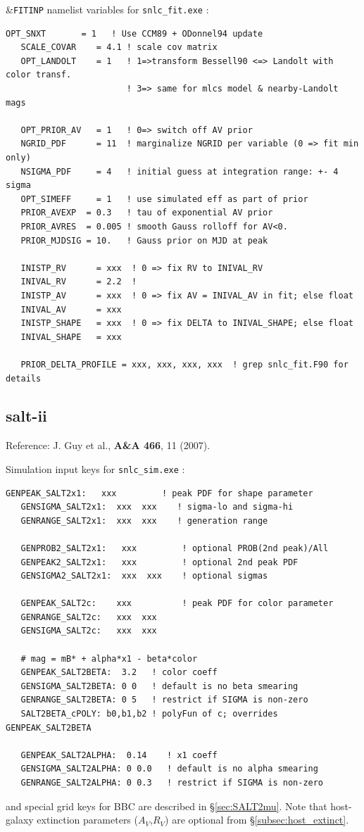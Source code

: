 \documentclass[12pt]{article}
\newcommand{\SALTII}{{\sc salt-ii}}
\begin{document}
\bigskip
\noindent
\&{\tt FITINP} namelist variables for  {\tt snlc\_fit.exe} :
\begin{Verbatim}[frame=single]
   OPT_SNXT       = 1   ! Use CCM89 + ODonnel94 update
   SCALE_COVAR    = 4.1 ! scale cov matrix
   OPT_LANDOLT    = 1   ! 1=>transform Bessell90 <=> Landolt with color transf.
                        ! 3=> same for mlcs model & nearby-Landolt mags
 
   OPT_PRIOR_AV   = 1   ! 0=> switch off AV prior
   NGRID_PDF      = 11  ! marginalize NGRID per variable (0 => fit min only)
   NSIGMA_PDF     = 4   ! initial guess at integration range: +- 4 sigma
   OPT_SIMEFF     = 1   ! use simulated eff as part of prior 
   PRIOR_AVEXP  = 0.3   ! tau of exponential AV prior
   PRIOR_AVRES  = 0.005 ! smooth Gauss rolloff for AV<0.
   PRIOR_MJDSIG = 10.   ! Gauss prior on MJD at peak

   INISTP_RV      = xxx  ! 0 => fix RV to INIVAL_RV
   INIVAL_RV      = 2.2  ! 
   INISTP_AV      = xxx  ! 0 => fix AV = INIVAL_AV in fit; else float
   INIVAL_AV      = xxx 
   INISTP_SHAPE   = xxx  ! 0 => fix DELTA to INIVAL_SHAPE; else float
   INIVAL_SHAPE   = xxx

   PRIOR_DELTA_PROFILE = xxx, xxx, xxx, xxx  ! grep snlc_fit.F90 for details
\end{Verbatim}


\clearpage
\subsection{{\SALTII}}
\label{subsec:salt2}
Reference: J. Guy et al., {\bf A\&A 466}, 11 (2007). \cite{Guy07}

\noindent
Simulation input keys  for {\tt snlc\_sim.exe} :
\begin{Verbatim}[frame=single]
   GENPEAK_SALT2x1:   xxx         ! peak PDF for shape parameter
   GENSIGMA_SALT2x1:  xxx  xxx    ! sigma-lo and sigma-hi
   GENRANGE_SALT2x1:  xxx  xxx    ! generation range

   GENPROB2_SALT2x1:   xxx         ! optional PROB(2nd peak)/All
   GENPEAK2_SALT2x1:   xxx         ! optional 2nd peak PDF
   GENSIGMA2_SALT2x1:  xxx  xxx    ! optional sigmas

   GENPEAK_SALT2c:    xxx          ! peak PDF for color parameter
   GENRANGE_SALT2c:   xxx  xxx
   GENSIGMA_SALT2c:   xxx  xxx

   # mag = mB* + alpha*x1 - beta*color
   GENPEAK_SALT2BETA:  3.2   ! color coeff
   GENSIGMA_SALT2BETA: 0 0   ! default is no beta smearing
   GENRANGE_SALT2BETA: 0 5   ! restrict if SIGMA is non-zero
   SALT2BETA_cPOLY: b0,b1,b2 ! polyFun of c; overrides GENPEAK_SALT2BETA

   GENPEAK_SALT2ALPHA:  0.14    ! x1 coeff
   GENSIGMA_SALT2ALPHA: 0 0.0   ! default is no alpha smearing
   GENRANGE_SALT2ALPHA: 0 0.3   ! restrict if SIGMA is non-zero
\end{Verbatim}
%
and special grid keys for BBC are described in 
\S\ref{sec:SALT2mu}.
Note that host-galaxy extinction parameters ($A_V$,$R_V$) 
are optional from \S\ref{subsec:host_extinct}.
\end{document}
